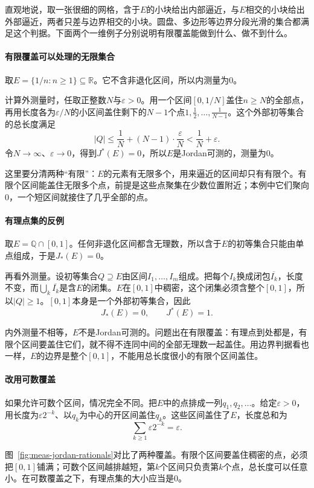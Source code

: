 直观地说，取一张很细的网格，含于$E$的小块给出内部逼近，与$E$相交的小块给出外部逼近，两者只差与边界相交的小块。圆盘、多边形等边界分段光滑的集合都满足这个判据。下面两个一维例子分别说明有限覆盖能做到什么、做不到什么。

\paragraph{有限覆盖可以处理的无限集合}
取$E=\{1/n:n\geq1\}\subseteq\mathbb R$。它不含非退化区间，所以内测量为$0$。

计算外测量时，任取正整数$N$与$\varepsilon>0$。用一个区间$[0,1/N]$盖住$n\geq N$的全部点，再用长度各为$\varepsilon/N$的小区间盖住剩下的$N-1$个点$1,\tfrac12,\dots,\tfrac1{N-1}$。这个外部初等集合的总长度满足
\[
 \lvert Q\rvert\leq\frac1N+(N-1)\cdot\frac{\varepsilon}{N}<\frac1N+\varepsilon.
\]
令$N\to\infty$、$\varepsilon\to0$，得到$J^*(E)=0$，所以$E$是Jordan可测的，测量为$0$。

这里要分清两种“有限”：$E$的元素有无限多个，用来逼近的区间却只有有限个。有限个区间能盖住无限多个点，前提是这些点聚集在少数位置附近；本例中它们聚向$0$，一个短区间就接住了几乎全部的点。

\paragraph{有理点集的反例}
取$E=\mathbb Q\cap[0,1]$。任何非退化区间都含无理数，所以含于$E$的初等集合只能由单点组成，于是$J_*(E)=0$。

再看外测量。设初等集合$Q\supseteq E$由区间$I_1,\dots,I_m$组成。把每个$I_k$换成闭包$\overline{I_k}$，长度不变，而$\bigcup_k\overline{I_k}$是含$E$的闭集。$E$在$[0,1]$中稠密，这个闭集必须含整个$[0,1]$，所以$\lvert Q\rvert\geq1$。$[0,1]$本身是一个外部初等集合，因此
\[
 J_*(E)=0,\qquad J^*(E)=1.
\]

内外测量不相等，$E$不是Jordan可测的。问题出在有限覆盖：有理点到处都是，有限个区间要盖住它们，就不得不连同中间的全部无理数一起盖住。用边界判据看也一样，$E$的边界是整个$[0,1]$，不能用总长度很小的有限个区间盖住。

\paragraph{改用可数覆盖}
如果允许可数个区间，情况完全不同。把$E$中的点排成一列$q_1,q_2,\dots$。给定$\varepsilon>0$，用长度为$\varepsilon2^{-k}$、以$q_k$为中心的开区间盖住$q_k$。这些区间盖住了$E$，长度总和为
\[
 \sum_{k\geq1}\varepsilon2^{-k}=\varepsilon.
\]

图~\ref{fig:meas-jordan-rationals}对比了两种覆盖。有限个区间要盖住稠密的点，必须把$[0,1]$铺满；可数个区间越排越短，第$k$个区间只负责第$k$个点，总长度可以任意小。在可数覆盖之下，有理点集的大小应当是$0$。

